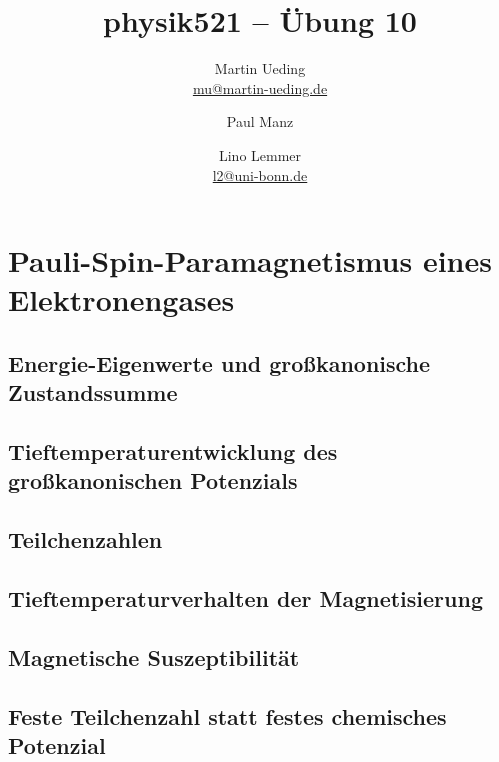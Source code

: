 

\title{physik521 – Übung 10}
\author{
	Martin Ueding \\ \small{\href{mailto:mu@martin-ueding.de}{mu@martin-ueding.de}}
        \and Paul Manz
        \and Lino Lemmer \\ \small{\href{mailto:l2@uni-bonn.de}{l2@uni-bonn.de}}
}

\pagestyle{plain}



\maketitle


\section{Pauli-Spin-Paramagnetismus eines Elektronengases}

\subsection{Energie-Eigenwerte und großkanonische Zustandssumme}

\fehlt

\subsection{Tieftemperaturentwicklung des großkanonischen Potenzials}

\fehlt

\subsection{Teilchenzahlen}

\fehlt

\subsection{Tieftemperaturverhalten der Magnetisierung}

\fehlt

\subsection{Magnetische Suszeptibilität}

\fehlt

\subsection{Feste Teilchenzahl statt festes chemisches Potenzial}

